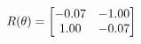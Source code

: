 \documentclass[preview]{standalone}
\begin{document}
\begin{align*}
\special{dvisvgm:raw <g id='unique000'>}R(\theta) = \begin{bmatrix}-0.07 & -1.00\\1.00 & -0.07\end{bmatrix}\special{dvisvgm:raw </g>}
\end{align*}
\end{document}
